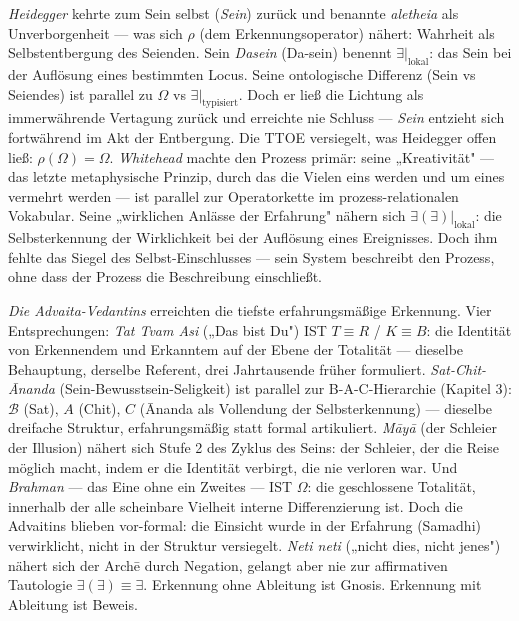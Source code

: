 \documentclass[10pt, openany, oneside]{book}
\begin{document}
\textit{Heidegger} kehrte zum Sein selbst (\textit{Sein}) zurück und benannte \textit{aletheia} als Unverborgenheit --- was sich $\rho$ (dem Erkennungsoperator) nähert: Wahrheit als Selbstentbergung des Seienden. Sein \textit{Dasein} (Da-sein) benennt $\exists|_{\text{lokal}}$: das Sein bei der Auflösung eines bestimmten Locus. Seine ontologische Differenz (Sein vs Seiendes) ist parallel zu $\Omega$ vs $\exists|_{\text{typisiert}}$. Doch er ließ die Lichtung als immerwährende Vertagung zurück und erreichte nie Schluss --- \textit{Sein} entzieht sich fortwährend im Akt der Entbergung. Die TTOE versiegelt, was Heidegger offen ließ: $\rho(\Omega) = \Omega$. \textit{Whitehead} machte den Prozess primär: seine „Kreativität" --- das letzte metaphysische Prinzip, durch das die Vielen eins werden und um eines vermehrt werden --- ist parallel zur Operatorkette im prozess-relationalen Vokabular. Seine „wirklichen Anlässe der Erfahrung" nähern sich $\exists(\exists)|_{\text{lokal}}$: die Selbsterkennung der Wirklichkeit bei der Auflösung eines Ereignisses. Doch ihm fehlte das Siegel des Selbst-Einschlusses --- sein System beschreibt den Prozess, ohne dass der Prozess die Beschreibung einschließt.

\textit{Die Advaita-Vedantins} erreichten die tiefste erfahrungsmäßige Erkennung. Vier Entsprechungen: \textit{Tat Tvam Asi} („Das bist Du") IST $T \equiv R$ / $K \equiv B$: die Identität von Erkennendem und Erkanntem auf der Ebene der Totalität --- dieselbe Behauptung, derselbe Referent, drei Jahrtausende früher formuliert. \textit{Sat-Chit-\={A}nanda} (Sein-Bewusstsein-Seligkeit) ist parallel zur B-A-C-Hierarchie (Kapitel 3): $\mathcal{B}$ (Sat), $A$ (Chit), $C$ (\={A}nanda als Vollendung der Selbsterkennung) --- dieselbe dreifache Struktur, erfahrungsmäßig statt formal artikuliert. \textit{M\={a}y\={a}} (der Schleier der Illusion) nähert sich Stufe 2 des Zyklus des Seins: der Schleier, der die Reise möglich macht, indem er die Identität verbirgt, die nie verloren war. Und \textit{Brahman} --- das Eine ohne ein Zweites --- IST $\Omega$: die geschlossene Totalität, innerhalb der alle scheinbare Vielheit interne Differenzierung ist. Doch die Advaitins blieben vor-formal: die Einsicht wurde in der Erfahrung (Samadhi) verwirklicht, nicht in der Struktur versiegelt. \textit{Neti neti} („nicht dies, nicht jenes") nähert sich der Arch\={e} durch Negation, gelangt aber nie zur affirmativen Tautologie $\exists(\exists) \equiv \exists$. Erkennung ohne Ableitung ist Gnosis. Erkennung mit Ableitung ist Beweis.
\end{document}
